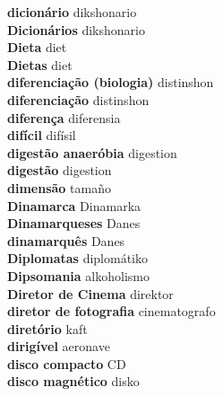 \textbf{ dicionário  } dikshonario \\
\textbf{ Dicionários  } dikshonario \\
\textbf{ Dieta  } diet \\
\textbf{ Dietas  } diet \\
\textbf{ diferenciação (biologia)  } distinshon \\
\textbf{ diferenciação  } distinshon \\
\textbf{ diferença  } diferensia \\
\textbf{ difícil  } difísil \\
\textbf{ digestão anaeróbia  } digestion \\
\textbf{ digestão  } digestion \\
\textbf{ dimensão  } tamaño \\
\textbf{ Dinamarca  } Dinamarka \\
\textbf{ Dinamarqueses  } Danes \\
\textbf{ dinamarquês  } Danes \\
\textbf{ Diplomatas  } diplomátiko \\
\textbf{ Dipsomania  } alkoholismo \\
\textbf{ Diretor de Cinema  } direktor \\
\textbf{ diretor de fotografia  } cinematografo \\
\textbf{ diretório  } kaft \\
\textbf{ dirigível  } aeronave \\
\textbf{ disco compacto  } CD \\
\textbf{ disco magnético  } disko \\
